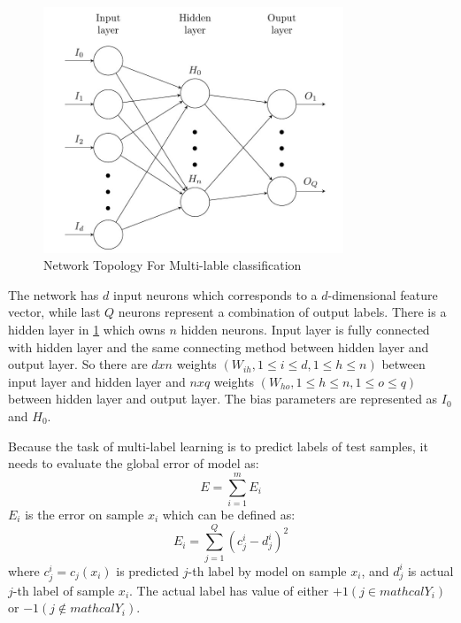 \graphicspath{ {./Figures/} }
\begin{figure}[!htb]
\centering
\includegraphics[width=0.8\textwidth]{MultiLabelNet.jpeg}
\caption{\label{fig:MultiLabelNet}Network Topology For Multi-lable classification}
\end{figure}

The network has $d$ input neurons which corresponds to a $d$-dimensional feature vector, while last $Q$ neurons represent a combination of output labels. There is a hidden layer in \ref{fig:MultiLabelNet} which owns $n$ hidden neurons. Input layer is fully connected with hidden layer and the same connecting method between hidden layer and output layer. So there are $d x n$ weights $(W_{ih}, 1 \leq i \leq d, 1 \leq h \leq n)$ between input layer and hidden layer and $n x q$ weights $(W_{ho}, 1 \leq h \leq n , 1 \leq o \leq q)$ between hidden layer and output layer. The bias parameters are represented as $I_{0}$ and  $H_{0}$.

Because the task of multi-label learning is to predict labels of test samples, it needs to evaluate the global error of model as:
\begin{equation}\label{eq:MultiLableError}
E = \sum_{i=1}^m E_{i}
\end{equation}
$E_{i}$ is the error on sample $x_{i}$ which can be defined as:
\begin{equation}\label{eq:MultiLableSamError}
E_{i} = \sum_{j=1}^Q (c_{j}^i - d_{j}^i)^2
\end{equation}
where $c_{j}^i = c_{j}(x_{i})$ is predicted $j$-th label by model on sample $x_{i}$, and $d_{j}^i$ is actual $j$-th label of sample $x_{i}$. The actual label has value of either $+1 (j \in mathcal{Y_{i}})$ or $-1 (j \notin mathcal{Y_{i}})$.

